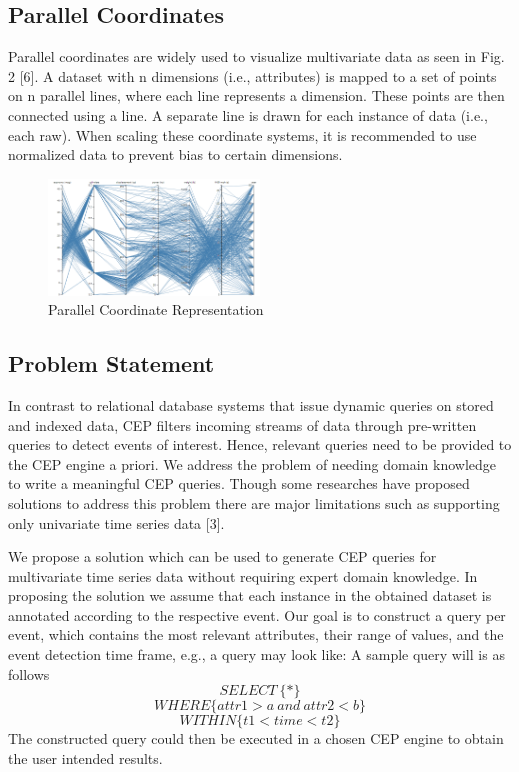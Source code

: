 \documentclass[letterpaper, 10 pt, conference]{IEEEtran}  %
\begin{document}
\subsection{Parallel Coordinates}

Parallel coordinates are widely used to visualize multivariate data as seen in Fig. 2 [6]. A dataset with n dimensions (i.e., attributes) is mapped to a set of points on n parallel lines, where each line represents a dimension. These points are then connected using a line. A separate line is drawn for each instance of data (i.e., each raw). When scaling these coordinate systems, it is recommended to use normalized data to prevent bias to certain dimensions.
\begin{figure}[h!]
\includegraphics[width=0.5\textwidth]{parrelel.png}
\caption{Parallel Coordinate Representation}
\end{figure}
 

\subsection{Problem Statement} 
In contrast to relational database systems that issue dynamic queries on stored and indexed data, CEP filters incoming streams of data through pre-written queries to detect events of interest. Hence, relevant queries need to be provided to the CEP engine a priori. We address the problem of needing domain knowledge to write a meaningful CEP queries. Though some researches have proposed solutions to address this problem there are major limitations such as supporting only univariate time series data [3]. 

We propose a solution which can be used to generate CEP queries for multivariate time series data without requiring expert domain knowledge. In proposing the solution we assume that each instance in the obtained dataset is annotated according to the respective event. Our goal is to construct a query per event, which contains the most relevant attributes, their range of values, and the event detection time frame, e.g., a query may look like:  A sample query will is as follows
\[SELECT \ \{*\} \]
\[WHERE\{attr1>a\ and \ attr2<b\}\]
\[ WITHIN\{t1<time<t2\}\]
The constructed query could then be executed in a chosen CEP engine to obtain the user intended results.
\end{document}
